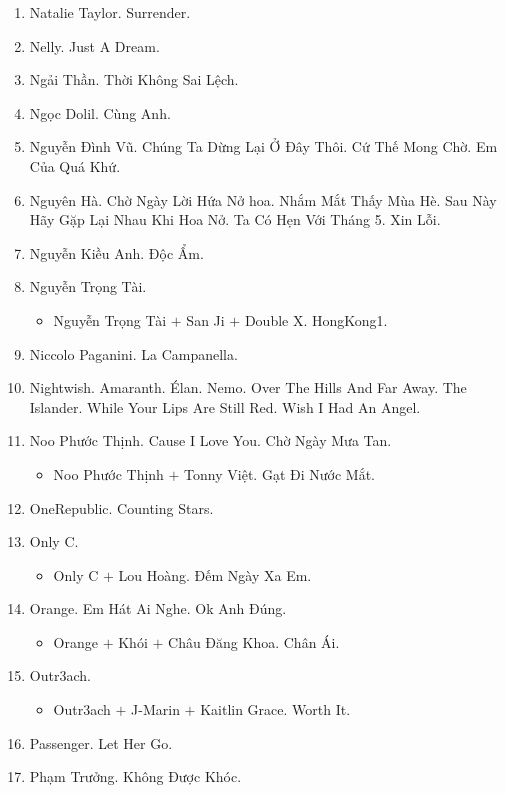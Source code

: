 \documentclass{article}
\begin{document}
\begin{enumerate}
	\item {\sc Natalie Taylor.} Surrender.
	\item {\sc Nelly.} Just A Dream.
	\item {\sc Ngải Thần.} Thời Không Sai Lệch.
	\item {\sc Ngọc Dolil.} Cùng Anh.
	\item {\sc Nguyễn Đình Vũ.} Chúng Ta Dừng Lại Ở Đây Thôi. Cứ Thế Mong Chờ. Em Của Quá Khứ.
	\item {\sc Nguyên Hà.} Chờ Ngày Lời Hứa Nở hoa. Nhắm Mắt Thấy Mùa Hè. Sau Này Hãy Gặp Lại Nhau Khi Hoa Nở. Ta Có Hẹn Với Tháng 5. Xin Lỗi.
	\item {\sc Nguyễn Kiều Anh.} Độc Ẩm.
	\item {\sc Nguyễn Trọng Tài.}
	\begin{itemize}
		\item {\sc Nguyễn Trọng Tài $+$ San Ji $+$ Double X.} HongKong1.
	\end{itemize}
	\item {\sc Niccolo Paganini.} La Campanella.
	\item {\sc Nightwish.} Amaranth. \'Elan. Nemo. Over The Hills And Far Away. The Islander. While Your Lips Are Still Red. Wish I Had An Angel.
	\item {\sc Noo Phước Thịnh.} Cause I Love You. Chờ Ngày Mưa Tan.
	\begin{itemize}
		\item {\sc Noo Phước Thịnh $+$ Tonny Việt.} Gạt Đi Nước Mắt.
	\end{itemize}
	\item {\sc OneRepublic.} Counting Stars.
	\item {\sc Only C.}
	\begin{itemize}
		\item {\sc Only C $+$ Lou Hoàng.} Đếm Ngày Xa Em.
	\end{itemize}
	\item {\sc Orange.} Em Hát Ai Nghe. Ok Anh Đúng.
	\begin{itemize}
		\item {\sc Orange $+$ Khói $+$ Châu Đăng Khoa.} Chân Ái.
	\end{itemize}
	\item {\sc Outr3ach.}
	\begin{itemize}
		\item {\sc Outr3ach $+$ J-Marin $+$ Kaitlin Grace.} Worth It.
	\end{itemize}
	\item {\sc Passenger.} Let Her Go.
	\item {\sc Phạm Trưởng.} Không Được Khóc.

\end{enumerate}
\end{document}
